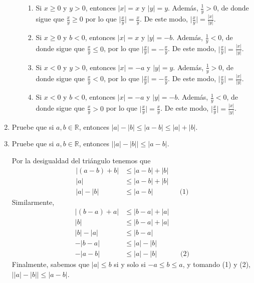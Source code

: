 \documentclass[11pt]{article}
\newcommand{\R}{\mathbb{R}}
\begin{document}
\begin{enumerate}
\begin{enumerate}[label=(\alph*)]
  \begin{enumerate}[label=\roman*)]
      \item Si $x \geq 0$ y $y>0$, entonces $|x|=x$ y $|y|=y$. Además, $\frac{1}{y} >0$, de donde sigue que $\frac{x}{y} \geq 0$ por lo que $\big| \frac{x}{y} \big| = \frac{x}{y}$. De este modo, $ \big| \frac{x}{y} \big| = \frac{|x|}{|y|}$.
      \item Si $x \geq 0$ y $b<0$, entonces $|x|=x$ y $|y|=-b$. Además, $\frac{1}{y} <0$, de donde sigue que $\frac{x}{y} \leq 0$, por lo que $\big| \frac{x}{y} \big| =- \frac{x}{y}$. De este modo, $ \big| \frac{x}{y} \big| = \frac{|x|}{|y|}$.
      \item Si $x<0$ y $y>0$, entonces $|x|=-a$ y $|y|=y$. Además, $\frac{1}{y} >0$, de donde sigue que $\frac{x}{y} < 0$, por lo que $\big| \frac{x}{y} \big| =- \frac{x}{y}$. De este modo, $ \big| \frac{x}{y} \big| = \frac{|x|}{|y|}$.
      \item Si $x<0$ y $b<0$, entonces $|x|=-a$ y $|y|=-b$. Además, $\frac{1}{y} <0$, de donde sigue que $\frac{x}{y} > 0$ por lo que $\big| \frac{x}{y} \big| = \frac{x}{y}$. De este modo, $ \big| \frac{x}{y} \big| = \frac{|x|}{|y|}$.
  \end{enumerate}
 \end{enumerate}

\item Pruebe que si $a,b\in \R$, entonces $|a|-|b|\leq |a-b|\leq |a|+|b|$.

\item Pruebe que si $a,b\in \R$, entonces $\big| |a|-|b| \big|\leq |a-b|$.

Por la desigualdad del triángulo tenemos que
        \begin{align*}
            |(a-b)+b| &\leq |a-b|+|b| \\
            |a| &\leq |a-b|+|b| \\
            |a|-|b| &\leq |a-b| && \text{(1)}
        \end{align*}
        Similarmente, 
        \begin{align*}
            |(b-a)+a| &\leq |b-a|+|a| \\
            |b| &\leq |b-a|+|a| \\
            |b|-|a| &\leq |b-a| \\
            -|b-a| &\leq |a|-|b|\\
            -|a-b| &\leq |a|-|b| && \text{(2)}
        \end{align*}
        Finalmente, sabemos que $|a|\leq b$ si y solo si $-a\leq b\leq a$, y tomando (1) y (2), $\big| |a| - |b| \big| \leq |a-b|$.
\end{enumerate}
\end{document}
